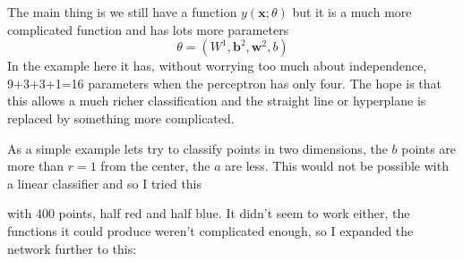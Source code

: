 \documentclass[12pt]{article}
\begin{document}
The main thing is we still have a function $y(\mathbf{x};\theta)$ but
it is a much more complicated function and has lots more parameters
\begin{equation}
  \theta=(W^1,\mathbf{b}^2,\mathbf{w}^2,b)
\end{equation}
In the example here it has, without worrying too much about
independence, 9+3+3+1=16 parameters when the perceptron has only
four. The hope is that this allows a much richer classification and
the straight line or hyperplane is replaced by something more
complicated.

As a simple example lets try to classify points in two dimensions, the
$b$ points are more than $r=1$ from the center, the $a$ are
less. This would not be possible with a linear classifier and so I tried this
\begin{center}
\end{center}
with 400 points, half red and half blue. It didn't seem to work either, the functions it could produce weren't complicated enough, so I expanded the network further to this:
\end{document}
